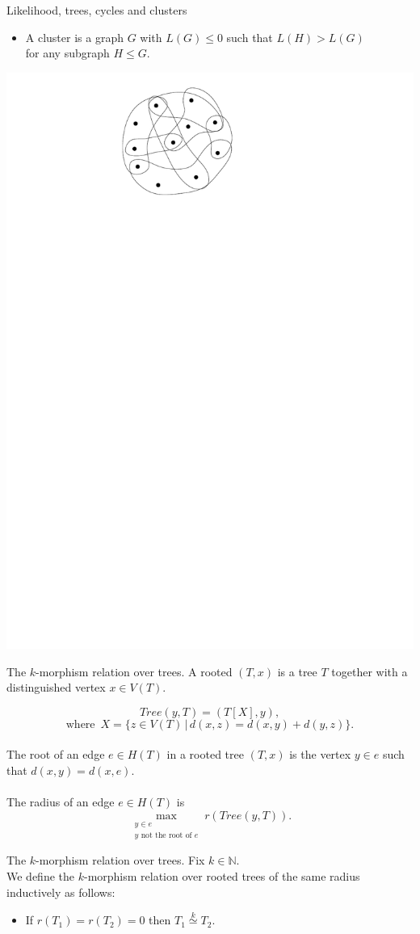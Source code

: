 \documentclass[11pt]{beamer}
\newcommand{\N}{\mathbb{N}}
\newcommand{\morph}[1]{\stackrel{#1}{\simeq}}
\begin{document}
	\begin{frame}{Likelihood, trees, cycles and clusters}
		\begin{itemize}
			\item A cluster is a graph $G$ with $L(G)\leq 0$ such 
			that $L(H)>L(G)$\\ for any subgraph $H\leq G$.
		\end{itemize}
	\begin{center}
		\includegraphics[width=0.4\linewidth]{Cluster.pdf}
	\end{center}
	\end{frame}
	
	\begin{frame}{The $k$-morphism relation over trees.}
		A rooted $(T,x)$ is a tree $T$ together with a distinguished vertex
		$x\in V(T)$.\par
		\[Tree(y, T) = (T[X], y),\]
		\[\text{where } \, X=\{ z\in V(T) \, | \, d(x,z)=d(x,y)+d(y,z)\}.\]~\\
		The root of an edge $e\in H(T)$ in a rooted tree 
		$(T,x)$ is the vertex $y\in e$ such that $d(x,y)=d(x,e)$.\\~\\
		The radius of an edge $e\in H(T)$ is 
		\[\max_{\substack{y\in e \\ y \text{ not the root of } e}} r(Tree(y,T)). \]
		
	\end{frame}

	\begin{frame}{The $k$-morphism relation over trees.}
		Fix $k\in \N$.\\
		We define the $k$-morphism relation over rooted trees of the same radius
		inductively as follows:
		
		\begin{itemize}
			\item If $r(T_1)=r(T_2)=0$ then $T_1\morph{k} T_2$.
		\end{itemize}
	\end{frame}
\end{document}
